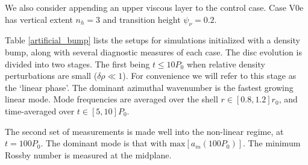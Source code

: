 We also consider appending an upper viscous layer to the control
case. Case V0e has vertical extent $n_h=3$ and transition height
$\psi_\nu=0.2$. 




































Table \ref{artificial_bump} lists the setups for simulations 
initialized with a density bump, along with several diagnostic measures 
of each case. The disc evolution is divided into two stages. The first
being $t\leq 10P_0$ when relative density perturbations are small 
($\delta\rho\ll 1$). For convenience we will refer 
to this stage as the `linear phase'. The dominant azimuthal wavenumber
is the fastest growing linear mode. Mode frequencies are averaged over
the shell $r\in[0.8,1.2]r_0$, and time-averaged over $t\in[5,10]P_0$.    

The second set of measurements is made well into the non-linear
regime, at $t=100P_0$. The dominant mode is that with
$\mathrm{max}[a_m(100P_0)]$. The minimum Rossby number is measured at
the midplane. 

